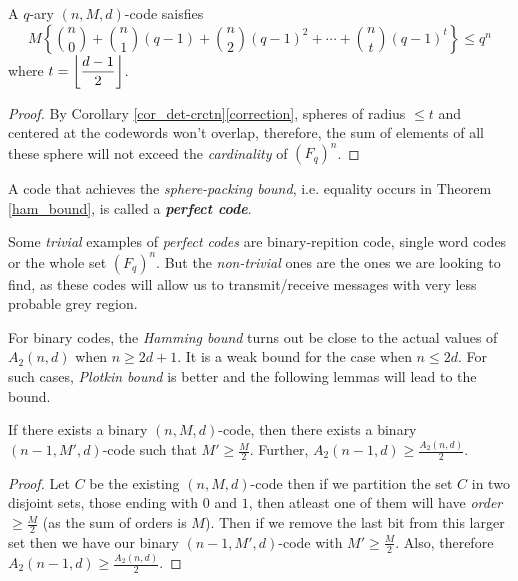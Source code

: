 \documentclass[../main.tex]{subfiles}
\begin{document}
\begin{thm}\label{ham_bound}
	A $q$-ary $(n,M,d)$-code saisfies
	\[
		M\left\{\binom{n}{0}+\binom{n}{1}(q-1)+\binom{n}{2}(q-1)^2+\cdots + \binom{n}{t}(q-1)^t \right\} \leq q^n
	\]
	where $t=\left\lfloor \dfrac{d-1}{2} \right\rfloor$.
\end{thm}
	
\begin{proof}
	By Corollary \ref{cor_det-crctn}\ref{correction}, spheres of radius $\leq t$ and centered at the codewords won't overlap, therefore, the sum of elements of all these sphere will not exceed the \emph{cardinality} of $(F_q)^n$. 
\end{proof}

\begin{defn}
	A code that achieves the \emph{sphere-packing bound}, i.e. equality occurs in Theorem \ref{ham_bound}, is called a \textbf{\emph{perfect code}}.  
\end{defn}
Some \emph{trivial} examples of \emph{perfect codes} are binary-repition code, single word codes or the whole set $(F_q)^n$. But the \emph{non-trivial} ones are the ones we are looking to find, as these codes will allow us to transmit/receive messages with very less probable grey region.

\begin{remark}
	For binary codes, the \emph{Hamming bound} turns out be close to the actual values of $A_2(n,d)$ when $n \geq 2d+1$. It is a weak bound for the case when $n \leq 2d$. For such cases, \emph{Plotkin bound} is better and the following lemmas will lead to the bound.	
\end{remark}

\begin{lem}\label{plotkin_lemma1}
	If there exists a binary $(n,M,d)$-code, then there exists a binary $(n-1, M',d)$-code such that $M'\geq \frac{M}{2}$. Further, $A_2(n-1,d)\geq \frac{A_2(n,d)}{2}$.
\end{lem}

\begin{proof}
	Let $C$ be the existing $(n,M,d)$-code then if we partition the set $C$ in two disjoint sets, those ending with $0$ and $1$, then atleast one of them will have \emph{order} $\geq \frac{M}{2}$ (as the sum of orders is $M$). Then if we remove the last bit from this larger set then we have our binary $(n-1,M',d)$-code with $M'\geq \frac{M}{2}$. Also, therefore $A_2(n-1,d)\geq \frac{A_2(n,d)}{2}$.
\end{proof}
\end{document}
